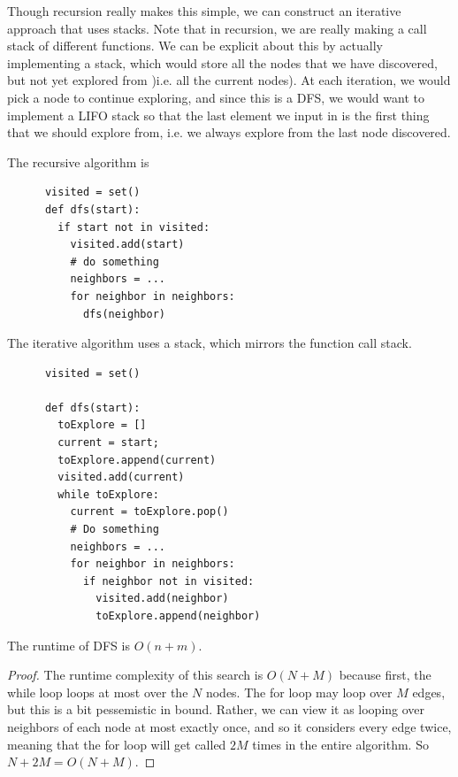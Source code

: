   Though recursion really makes this simple, we can construct an iterative approach that uses stacks. Note that in recursion, we are really making a call stack of different functions. We can be explicit about this by actually implementing a stack, which would store all the nodes that we have discovered, but not yet explored from )i.e. all the current nodes). At each iteration, we would pick a node to continue exploring, and since this is a DFS, we would want to implement a LIFO stack so that the last element we input in is the first thing that we should explore from, i.e. we always explore from the last node discovered. 

  \begin{definition}[DFS]
    The recursive algorithm is 
    \begin{lstlisting}
      visited = set() 
      def dfs(start): 
        if start not in visited: 
          visited.add(start) 
          # do something 
          neighbors = ... 
          for neighbor in neighbors: 
            dfs(neighbor)
    \end{lstlisting}

    The iterative algorithm uses a stack, which mirrors the function call stack. 
    \begin{lstlisting}
      visited = set() 

      def dfs(start): 
        toExplore = [] 
        current = start; 
        toExplore.append(current) 
        visited.add(current) 
        while toExplore: 
          current = toExplore.pop() 
          # Do something
          neighbors = ... 
          for neighbor in neighbors: 
            if neighbor not in visited: 
              visited.add(neighbor) 
              toExplore.append(neighbor)
    \end{lstlisting}
  \end{definition}

  \begin{theorem}
    The runtime of DFS is $O(n+m)$. 
  \end{theorem}
  \begin{proof}
    The runtime complexity of this search is $O(N + M)$ because first, the while loop loops at most over the $N$ nodes. The for loop may loop over $M$ edges, but this is a bit pessemistic in bound. Rather, we can view it as looping over neighbors of each node at most exactly once, and so it considers every edge twice, meaning that the for loop will get called $2M$ times in the entire algorithm. So $N + 2M = O(N + M)$. 
  \end{proof}

